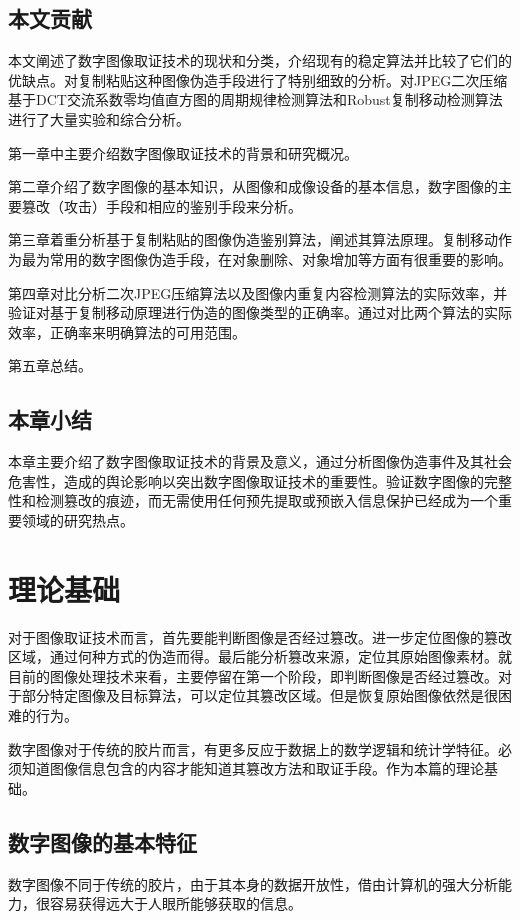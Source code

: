 \documentclass[a4paper, 10pt, notitlepage]{report}
\begin{document}
	\section{本文贡献}
		本文阐述了数字图像取证技术的现状和分类，介绍现有的稳定算法并比较了它们的优缺点。对复制粘贴这种图像伪造手段进行了特别细致的分析。对JPEG二次压缩基于DCT交流系数零均值直方图的周期规律检测算法和Robust复制移动检测算法进行了大量实验和综合分析。

		第一章中主要介绍数字图像取证技术的背景和研究概况。

		第二章介绍了数字图像的基本知识，从图像和成像设备的基本信息，数字图像的主要篡改（攻击）手段和相应的鉴别手段来分析。
	
		第三章着重分析基于复制粘贴的图像伪造鉴别算法，阐述其算法原理。复制移动作为最为常用的数字图像伪造手段，在对象删除、对象增加等方面有很重要的影响。
	
		第四章对比分析二次JPEG压缩算法以及图像内重复内容检测算法的实际效率，并验证对基于复制移动原理进行伪造的图像类型的正确率。通过对比两个算法的实际效率，正确率来明确算法的可用范围。
	
		第五章总结。

	\section{本章小结}
		本章主要介绍了数字图像取证技术的背景及意义，通过分析图像伪造事件及其社会危害性，造成的舆论影响以突出数字图像取证技术的重要性。验证数字图像的完整性和检测篡改的痕迹，而无需使用任何预先提取或预嵌入信息保护已经成为一个重要领域的研究热点。


\chapter{理论基础}
	对于图像取证技术而言，首先要能判断图像是否经过篡改。进一步定位图像的篡改区域，通过何种方式的伪造而得。最后能分析篡改来源，定位其原始图像素材。就目前的图像处理技术来看，主要停留在第一个阶段，即判断图像是否经过篡改。对于部分特定图像及目标算法，可以定位其篡改区域。但是恢复原始图像依然是很困难的行为。

	数字图像对于传统的胶片而言，有更多反应于数据上的数学逻辑和统计学特征。必须知道图像信息包含的内容才能知道其篡改方法和取证手段。作为本篇的理论基础。

	\section{数字图像的基本特征}
		数字图像不同于传统的胶片，由于其本身的数据开放性，借由计算机的强大分析能力，很容易获得远大于人眼所能够获取的信息。
\end{document}
